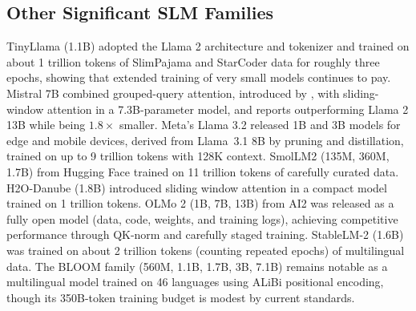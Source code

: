 \subsection{Other Significant SLM Families}
\label{subsubsec:other_slm_families}
TinyLlama (1.1B) \citep{zhang2024tinyllama} adopted the Llama 2 architecture and tokenizer and trained on about 1 trillion tokens of SlimPajama and StarCoder data for roughly three epochs, showing that extended training of very small models continues to pay. Mistral 7B \citep{jiang2023mistral} combined grouped-query attention, introduced by \citet{ainslie2023gqa}, with sliding-window attention in a 7.3B-parameter model, and reports outperforming Llama 2 13B while being $1.8\times$ smaller. Meta's Llama 3.2 \citep{meta2024llama32} released 1B and 3B models for edge and mobile devices, derived from Llama~3.1 8B by pruning and distillation, trained on up to 9 trillion tokens with 128K context. SmolLM2 (135M, 360M, 1.7B) \citep{allal2025smollm2} from Hugging Face trained on 11 trillion tokens of carefully curated data. H2O-Danube (1.8B) \citep{singer2024h2odanube} introduced sliding window attention in a compact model trained on 1 trillion tokens. OLMo 2 (1B, 7B, 13B) \citep{olmo2025} from AI2 was released as a fully open model (data, code, weights, and training logs), achieving competitive performance through QK-norm and carefully staged training. StableLM-2 (1.6B) \citep{stabilityai2024stablelm} was trained on about 2 trillion tokens (counting repeated epochs) of multilingual data. The BLOOM family (560M, 1.1B, 1.7B, 3B, 7.1B) \citep{bloom2022} remains notable as a multilingual model trained on 46 languages using ALiBi positional encoding, though its 350B-token training budget is modest by current standards.


